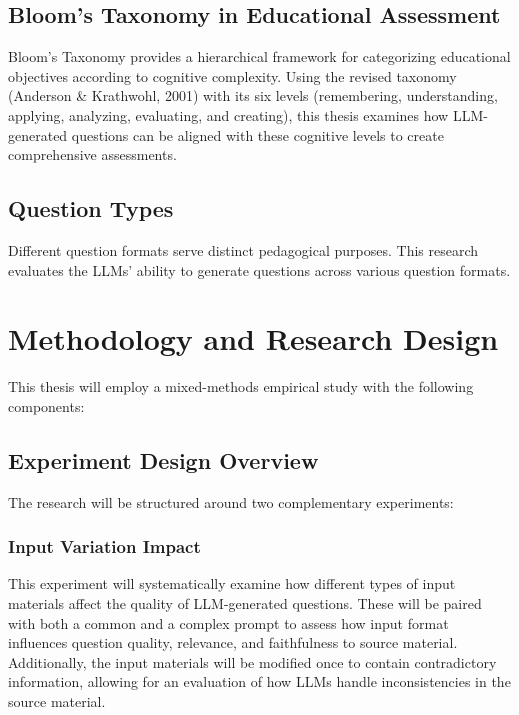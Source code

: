 \documentclass[12pt]{article}
\begin{document}
\subsection{Bloom's Taxonomy in Educational Assessment}
Bloom's Taxonomy provides a hierarchical framework for categorizing educational objectives according to cognitive complexity. Using the revised taxonomy (Anderson \& Krathwohl, 2001) with its six levels (remembering, understanding, applying, analyzing, evaluating, and creating), this thesis examines how LLM-generated questions can be aligned with these cognitive levels to create comprehensive assessments.

\subsection{Question Types}
Different question formats serve distinct pedagogical purposes. This research evaluates the LLMs' ability to generate questions across various question formats.

\section{Methodology and Research Design}
This thesis will employ a mixed-methods empirical study with the following components:

\subsection{Experiment Design Overview}
The research will be structured around two complementary experiments:

\subsubsection{Input Variation Impact}
This experiment will systematically examine how different types of input materials affect the quality of LLM-generated questions. These will be paired with both a common and a complex prompt to assess how input format influences question quality, relevance, and faithfulness to source material. Additionally, the input materials will be modified once to contain contradictory information, allowing for an evaluation of how LLMs handle inconsistencies in the source material.
% 
\end{document}
